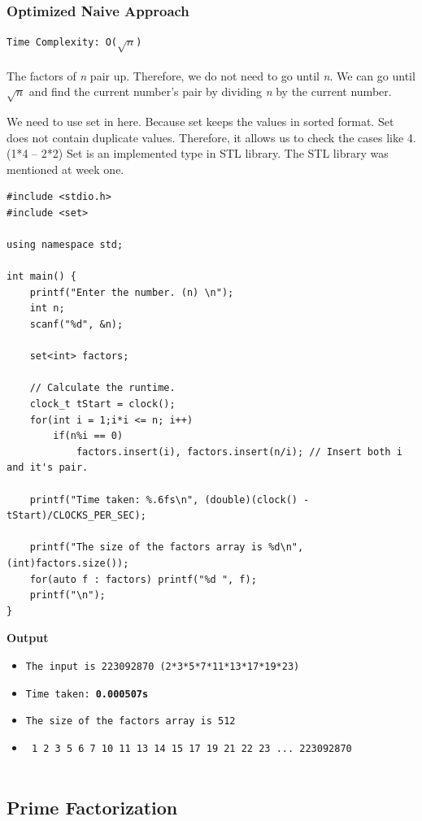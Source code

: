 \documentclass[12pt]{article}
\begin{document}
\subsubsection{Optimized Naive Approach }
\texttt{Time Complexity: O($\sqrt{n}$) } \\ \\
The factors of \textit{n} pair up. Therefore, we do not need to go until \textit{n}. We can go until $\sqrt{n}$ and find the current number's pair by dividing \textit{n} by the current number.

We need to use set in here. Because set keeps the values in sorted format. Set does not contain duplicate values. \cite{set}  Therefore, it allows us to check the cases like 4. (1*4  -- 2*2) Set is an implemented type in STL library. The STL library was mentioned at week one.

\begin{verbatim}
#include <stdio.h>
#include <set>

using namespace std;

int main() {
    printf("Enter the number. (n) \n");
    int n;
    scanf("%d", &n);
    
    set<int> factors;
    
    // Calculate the runtime.
    clock_t tStart = clock();
    for(int i = 1;i*i <= n; i++)
        if(n%i == 0)
            factors.insert(i), factors.insert(n/i); // Insert both i and it's pair.
    
    printf("Time taken: %.6fs\n", (double)(clock() - tStart)/CLOCKS_PER_SEC);
    
    printf("The size of the factors array is %d\n", (int)factors.size());
    for(auto f : factors) printf("%d ", f);
    printf("\n");
}
\end{verbatim}
\textbf{Output}

\begin{itemize}
  \item \texttt{The input is 223092870 (2*3*5*7*11*13*17*19*23)} 
  \item \texttt{Time taken: \textbf{0.000507s}} 
  \item \texttt{The size of the factors array is 512}
  \item \texttt{ 1 2 3 5 6 7 10 11 13 14 15 17 19 21 22 23 ...  223092870 } \\\\
\end{itemize}

\subsection{Prime Factorization}
\end{document}
